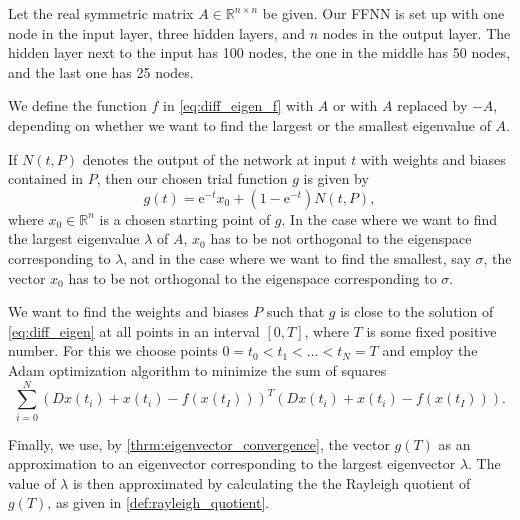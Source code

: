 Let the real symmetric matrix $A\in\mathbb{R}^{n\times n}$ be given. Our FFNN is set up with one node in the input layer, three hidden layers, and $n$ nodes in the output layer. The hidden layer next to the input has 100 nodes, the one in the middle has 50 nodes, and the last one has 25 nodes.

We define the function $f$ in \autoref{eq:diff_eigen_f} with $A$ or with $A$ replaced by $-A$, depending on whether we want to find the largest or the smallest eigenvalue of $A$.

If $N(t,P)$ denotes the output of the network at input $t$ with weights and biases contained in $P$, then our chosen trial function $g$ is given by
\begin{equation*}
    g(t) = \mathrm{e}^{-t}x_0 + (1-\mathrm{e}^{-t})N(t,P),
\end{equation*}
where $x_0\in\mathbb{R}^n$ is a chosen starting point of $g$. In the case where we want to find the largest eigenvalue $\lambda$ of $A$, $x_0$ has to be not orthogonal to the eigenspace corresponding to $\lambda$, and in the case where we want to find the smallest, say $\sigma$, the vector $x_0$ has to be not orthogonal to the eigenspace corresponding to $\sigma$.

We want to find the weights and biases $P$ such that $g$ is close to the solution of \autoref{eq:diff_eigen} at all points in an interval $[0,T]$, where $T$ is some fixed positive number. For this we choose points $0=t_0<t_1<\ldots<t_N=T$ and employ the Adam optimization algorithm to minimize the sum of squares
\begin{equation*}
    \sum_{i=0}^N(Dx(t_i)+x(t_i)-f(x(t_I)))^T(Dx(t_i)+x(t_i)-f(x(t_I))).
\end{equation*}

Finally, we use, by \autoref{thrm:eigenvector_convergence}, the vector $g(T)$ as an approximation to an eigenvector corresponding to the largest eigenvector $\lambda$. The value of $\lambda$ is then approximated by calculating the the Rayleigh quotient of $g(T)$, as given in \autoref{def:rayleigh_quotient}.

